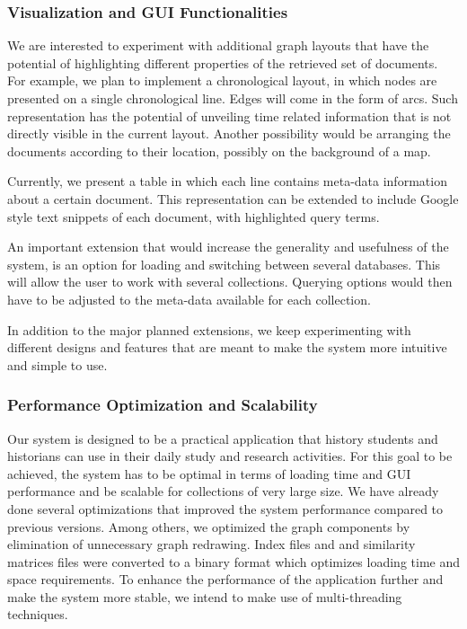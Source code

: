 \subsubsection{Visualization and GUI Functionalities}

We are interested to experiment with additional graph layouts that have the potential of highlighting different properties of the 
retrieved set of documents. For example, we plan to implement a chronological layout, in which nodes are presented on a single chronological 
line. Edges will come in the form of arcs. Such representation has the potential of unveiling time related information that is not 
directly visible in the current layout. Another possibility would be arranging the documents according to their location, possibly on the background
of a map. 

Currently, we present a table in which each line contains meta-data information about a certain document. This representation can be extended
to include Google style text snippets of each document, with highlighted query terms.

An important extension that would increase the generality and usefulness of the system, 
is an option for loading and switching between several databases. This will allow the user to work with several collections. Querying options
would then have to be adjusted to the meta-data available for each collection.

In addition to the major planned extensions, we keep experimenting with different designs and features that are meant to make the
system more intuitive and simple to use. 

\subsubsection{Performance Optimization and Scalability}
Our system is designed to be a practical application that history students and historians can use in their daily study and research activities.
For this goal to be achieved, the system has to be optimal in terms of loading time and GUI performance and be scalable for collections 
of very large size. We have already done several optimizations that improved the system performance compared to
previous versions. Among others, we optimized the graph components by elimination of unnecessary graph redrawing. 
Index files and and similarity matrices files were converted to a binary format which optimizes loading time and space requirements. 
To enhance the performance of the application further and make the system more stable, we intend to make use of multi-threading techniques. 

